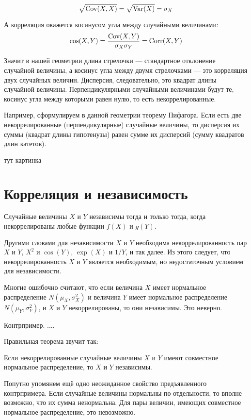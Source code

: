 \documentclass[10pt]{article}
\begin{document}
\[
\sqrt{\operatorname{Cov}(X,X)}=\sqrt{\operatorname{Var}(X)}=\sigma_X
\]

А корреляция окажется косинусом угла между случайными величинами:
\[
\cos(X,Y)=\frac{\operatorname{Cov}(X,Y)}{\sigma_X\sigma_Y}=\operatorname{Corr}(X,Y)
\]


Значит в нашей геометрии  длина стрелочки --- стандартное отклонение случайной величины, а косинус угла между двумя стрелочками --- это корреляция двух случайных величин. Дисперсия, следовательно, это квадрат длины случайной величины. Перпендикулярными случайными величинами будут те, косинус угла между которыми равен нулю, то есть некоррелированные.

Например, сформулируем в данной геометрии теорему Пифагора. Если есть две некоррелированные (перпендикулярные) случайные величины, то дисперсия их суммы (квадрат длины гипотенузы) равен сумме их дисперсий (сумму квадратов длин катетов).

тут картинка


\section{Корреляция и независимость}

\begin{theorem}
Случайные величины $X$ и $Y$ независимы тогда и только тогда, когда некоррелированы любые функции $f(X)$ и $g(Y)$.
\end{theorem}

Другими словами для независимости $X$ и $Y$ необходима некоррелированность пар $X$ и $Y$, $X^2$ и $\cos(Y)$, $\exp(X)$ и $1/Y$, и так далее. Из этого следует, что некоррелированность $X$ и $Y$ является необходимым, но недостаточным условием для независимости.

Многие ошибочно считают, что если величина $X$ имеет нормальное распределение $N(\mu_X, \sigma^2_X)$ и величина $Y$ имеет нормальное распределение $N(\mu_Y, \sigma^2_Y)$, и $X$ и $Y$ некоррелированы, то они независимы. Это неверно.

Контрпример. ....

Правильная теорема звучит так:

\begin{theorem}
Если некоррелированные случайные величины $X$ и $Y$ имеют совместное нормальное распределение, то $X$ и $Y$ независимы.
\end{theorem}

Попутно упомянем ещё одно неожиданное свойство предъявленного контрпримера. Если случайные величины нормальны по отдельности, то вполне возможно, что их сумма ненормальна. Для пары величин, имеющих совместное нормальное распределение, это невозможно.
\end{document}
